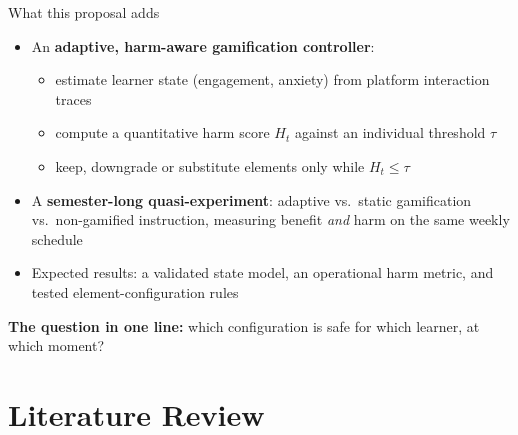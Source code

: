 \documentclass[10pt]{beamer}
\begin{document}
\begin{frame}{What this proposal adds}
\begin{itemize}
    \item An \textbf{adaptive, harm-aware gamification controller}:
    \begin{itemize}
        \item estimate learner state (engagement, anxiety) from platform interaction traces
        \item compute a quantitative harm score $H_t$ against an individual threshold $\tau$
        \item keep, downgrade or substitute elements only while $H_t \le \tau$
    \end{itemize}
    \item A \textbf{semester-long quasi-experiment}: adaptive vs.\ static gamification vs.\
    non-gamified instruction, measuring benefit \emph{and} harm on the same weekly schedule
    \item Expected results: a validated state model, an operational harm metric, and tested
    element-configuration rules
\end{itemize}
\vspace{0.2cm}
\begin{keybox}
\textbf{The question in one line:} which configuration is safe for which learner, at which moment?
\end{keybox}
\end{frame}


\section{Literature Review}
\end{document}
